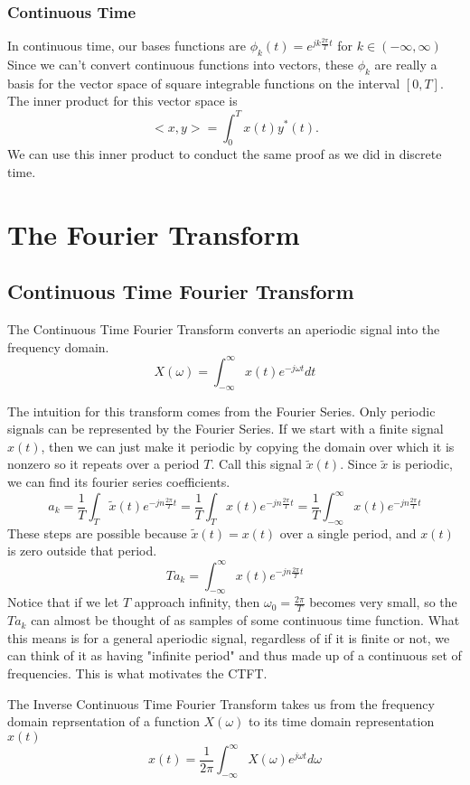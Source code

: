 \subsubsection{Continuous Time}
In continuous time, our bases functions are $\phi_k(t) = e^{jk\frac{2\pi}{T}t}$ for $k \in (-\infty, \infty)$
Since we can't convert continuous functions into vectors, these $\phi_k$ are really a basis for the vector space
of square integrable functions on the interval $[0, T]$.
The inner product for this vector space is 
\[
  <x, y> = \int_{0}^{T}{x(t)y^*(t)}.
\]
We can use this inner product to conduct the same proof as we did in discrete time.
\section{The Fourier Transform}
\subsection{Continuous Time Fourier Transform}
\begin{definition}
    The Continuous Time Fourier Transform converts an aperiodic signal into the frequency domain.
    \[
X(\omega) = \int_{-\infty}^{\infty}{x(t)e^{-j\omega t}dt}
\]
\end{definition}
The intuition for this transform comes from the Fourier Series. Only periodic signals can be represented by the Fourier Series.
If we start with a finite signal $x(t)$, then we can just make it periodic by copying the domain over which it is nonzero so 
it repeats over a period $T$. Call this signal $\tilde{x}(t)$. Since $\tilde{x}$ is periodic,
we can find its fourier series coefficients.
\[
    a_k = \frac{1}{T}\int_{T}{\tilde{x}(t)e^{-jn\frac{2\pi}{T}t}} = 
    \frac{1}{T}\int_{T}{x(t)e^{-jn\frac{2\pi}{T}t}} = \frac{1}{T}\int_{-\infty}^{\infty}{x(t)e^{-jn\frac{2\pi}{T}t}}
\]
These steps are possible because $\tilde{x}(t) = x(t)$ over a single period, and $x(t)$ is zero outside that period.
\[
Ta_k = \int_{-\infty}^{\infty}{x(t)e^{-jn\frac{2\pi}{T}t}}
\]
Notice that if we let $T$ approach infinity, then $\omega_0 = \frac{2\pi}{T}$ becomes very small, so the $Ta_k$
can almost be thought of as samples of some continuous time function. What this means is for a general aperiodic signal,
regardless of if it is finite or not, we can think of it as having "infinite period" and thus made up of a continuous set of frequencies.
This is what motivates the CTFT.
\begin{definition}
    The Inverse Continuous Time Fourier Transform takes us from the frequency domain
    reprsentation of a function $X(\omega)$ to its time domain representation $x(t)$
    \[
x(t) = \frac{1}{2\pi}\int_{-\infty}^{\infty}{X(\omega)e^{j\omega t}d\omega}
\]
\end{definition}
